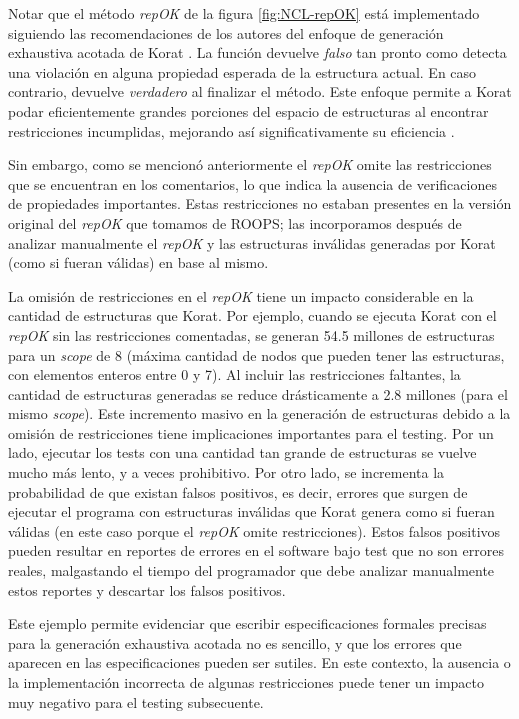 Notar que el método \emph{repOK} de la figura \ref{fig:NCL-repOK} está implementado siguiendo las recomendaciones de los autores del enfoque de generación exhaustiva acotada de \textsf{Korat} \cite{Boyapati02}. 
La función devuelve \emph{falso} tan pronto como detecta una violación en alguna propiedad esperada de la estructura actual. 
En caso contrario, devuelve \emph{verdadero} al finalizar el método. 
Este enfoque permite a \textsf{Korat} podar eficientemente grandes porciones del
espacio de estructuras al encontrar restricciones incumplidas, mejorando así significativamente su eficiencia \cite{Boyapati02}.

Sin embargo, como se mencionó anteriormente el \emph{repOK} omite las
restricciones que se encuentran en los comentarios, lo que indica la ausencia de
verificaciones de propiedades importantes. 
Estas restricciones no estaban presentes en la versión
original del \emph{repOK} que tomamos de ROOPS; 
las incorporamos después de analizar manualmente el \emph{repOK} y las
estructuras inválidas generadas por Korat (como si fueran válidas) en base al mismo.

La omisión de restricciones en el \emph{repOK} tiene un impacto considerable en
la cantidad de estructuras que \textsf{Korat}. 
Por ejemplo, cuando se ejecuta \textsf{Korat} con el \emph{repOK} sin las restricciones comentadas, 
se generan 54.5 millones de estructuras para un \emph{scope} de 8 (máxima
cantidad de nodos que pueden tener las estructuras, con elementos enteros entre
0 y 7). Al incluir las restricciones faltantes, 
la cantidad de estructuras generadas se reduce drásticamente a 2.8 millones
(para el mismo \emph{scope}).
Este incremento masivo en la generación de estructuras debido a la omisión de
restricciones tiene implicaciones importantes para el testing. Por un
lado, ejecutar los tests con una cantidad tan grande de estructuras se vuelve
mucho más lento, y a veces prohibitivo. Por otro lado,  
se incrementa la probabilidad de que existan falsos positivos, es decir, errores
que surgen de ejecutar el programa con estructuras inválidas que Korat genera
como si fueran válidas (en este caso porque el \emph{repOK} omite restricciones). 
Estos falsos positivos pueden resultar en reportes de errores en el software
bajo test que no son errores reales, malgastando el tiempo del programador que
debe analizar manualmente estos reportes y descartar los falsos positivos. 

Este ejemplo permite evidenciar que escribir especificaciones formales precisas
para la generación exhaustiva acotada no es sencillo, y que los errores que
aparecen en las especificaciones pueden ser sutiles. En este contexto, la ausencia o la
implementación incorrecta de algunas restricciones puede tener un impacto muy
negativo para el testing subsecuente. 

